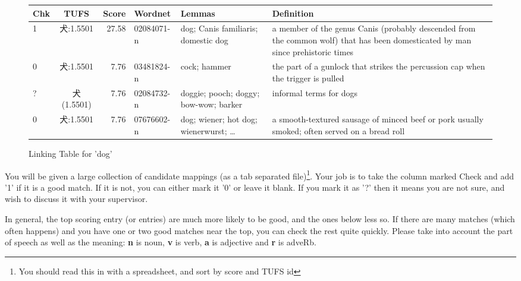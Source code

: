 \documentclass[11pt]{article}
\begin{document}
\begin{figure}[htpb]
  \centering
\begin{tabular}{lcrlp{3cm}p{5cm}}
Chk &     TUFS & Score & Wordnet & Lemmas & Definition \\ \hline
1 &    犬:1.5501 &  27.58 & 02084071-n &	dog; Canis familiaris;
                                           domestic dog & 	a member of
                                                          the genus Canis
                                                          (probably
                                                          descended from
                                                          the common wolf)
                                                          that has been
                                                          domesticated by
                                                          man since
                                                          prehistoric
                                                          times  \\
 0 &   犬:1.5501 &  7.76 & 03481824-n &  cock; hammer &	the part of a gunlock that strikes the percussion cap when the trigger is pulled\\
  ? &  犬 (1.5501) & 7.76 & 02084732-n & doggie; pooch; doggy; bow-wow;
                                          barker &	informal terms for dogs		\\
  0 &  犬:1.5501 &  7.76 & 07676602-n &dog; wiener; hot dog;
                                             wienerwurst; \ldots
                                             & a smooth-textured sausage of minced beef or pork usually smoked; often served on a bread roll	\\
  \end{tabular}
  
  \caption{Linking Table for 'dog'}
  \label{fig:linking}
\end{figure}


You will be given a large collection of candidate mappings (as a tab
separated file)\footnote{You should read this in with a spreadsheet,
  and sort by score and TUFS id}.  Your job
is to take the column marked Check and add '1' if it is a good match.
If it is not, you can either mark it '0' or leave it blank.  If you
mark it as '?' then it means you are not sure, and wish to discuss it
with your supervisor.    


In general, the top scoring entry (or entries) are much more likely to
be good, and the ones below less so.  If there are many matches (which
often happens) and you have one or two good matches near the top, you
can check the rest quite quickly.  Please take into account the part
of speech as well as the meaning: \textbf{n} is noun, \textbf{v} is
verb, \textbf{a} is adjective and \textbf{r} is adveRb.
\end{document}
